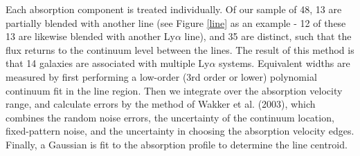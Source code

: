 Each absorption component is treated individually. Of our sample of 48, 13 are partially blended with another line (see Figure \ref{line} as an example - 12 of these 13 are likewise blended with another Ly$\alpha$ line), and 35 are distinct, such that the flux returns to the continuum level between the lines. The result of this method is that 14 galaxies are associated with multiple Ly$\alpha$ systems. Equivalent widths are measured by first performing a low-order (3rd order or lower) polynomial continuum fit in the line region. Then we integrate over the absorption velocity range, and calculate errors by the method of Wakker et al. (2003), which combines the random noise errors, the uncertainty of the continuum location, fixed-pattern noise, and the uncertainty in choosing the absorption velocity edges. Finally, a Gaussian is fit to the absorption profile to determine the line centroid.


